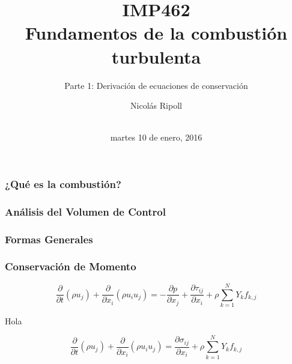 \documentclass[11pt]{beamer}
\author{Nicolás Ripoll} %
\title{IMP462 \\ Fundamentos de la combustión turbulenta}
\subtitle{Parte 1: Derivación de ecuaciones de conservación}
\institute{Departamento de Ingeniería Mecánica \\Universidad Técnica Federico Santa María}
\date{\\ martes 10 de enero, 2016}
\begin{document}
	\maketitle
	
	\begin{frame}
		\frametitle{¿Qué es la combustión?}
	\end{frame}

	\begin{frame}
		\frametitle{Análisis del Volumen de Control}
	\end{frame}
	
	\begin{frame}
		\frametitle{Formas Generales}
	\end{frame}
	
	\begin{frame}
		\frametitle{Conservación de Momento}
	
	
		\begin{equation} %
			\dfrac{\partial}{\partial t} \left(\rho u_{j}\right) + \dfrac{\partial}{\partial x_{i}} \left(\rho u_{i} u_{j}\right) = -\dfrac{\partial p}{\partial x_{j}} + \dfrac{\partial \tau_{i j}}{\partial x_{i}} + \rho \sum_{k=1}^{N} Y_{k} f_{k,j}
		\end{equation}

		Hola

		\begin{equation} %
			\dfrac{\partial}{\partial t} \left(\rho u_{j}\right) + \dfrac{\partial}{\partial x_{i}} \left(\rho u_{i} u_{j}\right) = \dfrac{\partial \sigma_{i j}}{\partial x_{i}} + \rho \sum_{k=1}^{N} Y_{k} f_{k,j}
		\end{equation}
		
	\end{frame}
	


\end{document}
